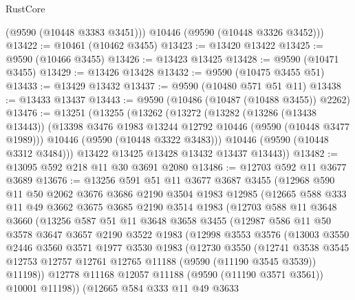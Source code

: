 \begin{lexlean}{RustCore}
\begin{coremodule}
        (@9590 (@10448 @3383 @3451)))
      @10446
      (@9590 (@10448 @3326 @3452)))
@13422 := @10461 (@10462 @3455)
@13423 := @13420 @13422
@13425 := @9590 (@10466 @3455)
@13426 := @13423 @13425
@13428 := @9590 (@10471 @3455)
@13429 := @13426 @13428
@13432 := @9590 (@10475 @3455 @51)
@13433 := @13429 @13432
@13437 := @9590 (@10480 @571 @51 @11)
@13438 := @13433 @13437
@13443 := @9590 (@10486 (@10487 (@10488 @3455)) @2262)
@13476 := @13251
    (@13255
      (@13262
        (@13272
          (@13282
            (@13286 (@13438 @13443))
            (@13398 @3476 @1983 @13244 @12792 @10446 (@9590 (@10448 @3477 @1989)))
            @10446
            (@9590 (@10448 @3322 @3483)))
          @10446
          (@9590 (@10448 @3312 @3484)))
        @13422
        @13425
        @13428
        @13432
        @13437
        @13443))
@13482 := @13095 @592 @218 @11 @30 @3691 @2080
@13486 := @12703 @592 @11 @3677 @3689
@13676 := @13256
    @591
    @51
    @11
    @3677
    @3687
    @3455
    (@12968
      @590
      @11
      @50
      @2062
      @3676
      @3686
      @2190
      @3504
      @1983
      @12985
      (@12665
        @588
        @333
        @11
        @49
        @3662
        @3675
        @3685
        @2190
        @3514
        @1983
        (@12703
          @588
          @11
          @3648
          @3660
          (@13256
            @587
            @51
            @11
            @3648
            @3658
            @3455
            (@12987
              @586
              @11
              @50
              @3578
              @3647
              @3657
              @2190
              @3522
              @1983
              (@12998
                @3553
                @3576
                (@13003
                  @3550
                  @2446
                  @3560
                  @3571
                  @1977
                  @3530
                  @1983
                  (@12730
                    @3550
                    (@12741
                      @3538
                      @3545
                      @12753
                      @12757
                      @12761
                      @12765
                      @11188
                      (@9590 (@11190 @3545 @3539))
                      @11198))
                  @12778
                  @11168
                  @12057
                  @11188
                  (@9590 (@11190 @3571 @3561))
                  @10001
                  @11198))
              (@12665
                @584
                @333
                @11
                @49
                @3633

\end{coremodule}
\end{lexlean}
